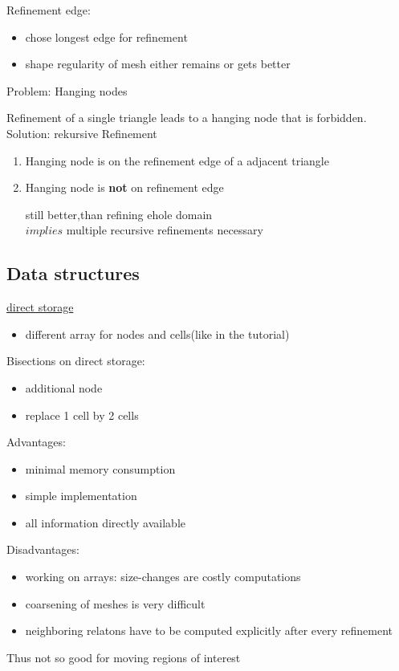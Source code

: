 Refinement edge:
\begin{itemize}
	\item chose longest edge for refinement
	\item shape regularity of mesh either remains or gets better
\end{itemize}

Problem: Hanging nodes

Refinement of a single triangle leads to a hanging node that is forbidden.\\
Solution: rekursive Refinement
\begin{enumerate}[label= case \arabic*:]
	\item Hanging node is on the refinement edge of a adjacent triangle
	

	\item Hanging node is \textbf{not} on refinement edge
	
	still better,than refining ehole domain\\
	$implies$ multiple recursive refinements necessary
\end{enumerate}

\subsection{Data structures}
\underline{direct storage}
\begin{itemize}
	\item different array for nodes and cells(like in the tutorial)
	
\end{itemize}
Bisections on direct storage:
\begin{itemize}
	\item additional node
	\item replace 1 cell by 2 cells
	
\end{itemize}

Advantages:
\begin{itemize}
	\item minimal memory consumption
	\item simple implementation
	\item all information directly available
\end{itemize}

Disadvantages:
\begin{itemize}
	\item working on arrays: size-changes are costly computations
	\item coarsening of meshes is very difficult
	\item neighboring relatons have to be computed explicitly after every refinement
\end{itemize}
Thus not so good for moving regions of interest

